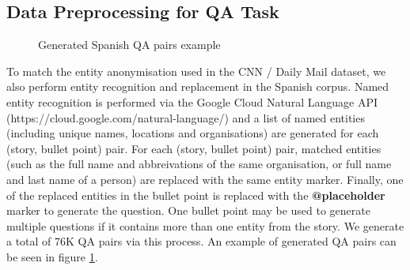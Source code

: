 \documentclass[]{article}
\begin{document}
\subsection{Data Preprocessing for QA Task}

\begin{center}
	\begin{figure}
	\caption{Generated Spanish QA pairs example}
	\label{fig:esqa}
	\end{figure}
\end{center}

To match the entity anonymisation used in the CNN / Daily Mail dataset, we also perform entity recognition and replacement in the Spanish corpus. Named entity recognition is performed via the Google Cloud Natural Language API (https://cloud.google.com/natural-language/) and a list of named entities (including unique names, locations and organisations) are generated for each (story, bullet point) pair. For each (story, bullet point) pair, matched entities (such as the full name and abbreivations of the same organisation, or full name and last name of a person) are replaced with the same entity marker. Finally, one of the replaced entities in the bullet point is replaced with the \textbf{@placeholder} marker to generate the question. One bullet point may be used to generate multiple questions if it contains more than one entity from the story. We generate a total of 76K QA pairs via this process. An example of generated QA pairs can be seen in figure \ref{fig:esqa}.
\end{document}
